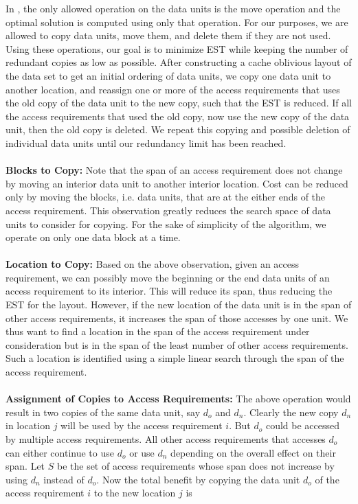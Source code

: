In \cite{cacheobliviouslayout}, the only allowed operation on the data units is
the move operation and the optimal solution is computed using only that
operation. For our purposes, we are allowed to copy data units, move them, and
delete them if they are not used. Using these operations, our goal is to minimize EST
while keeping the number of redundant copies as low as possible. After constructing a cache oblivious layout 
of the data set to get an initial ordering of data units, we copy one data unit to another location, and reassign 
one or more of the access requirements that uses the old copy of the data unit to the new copy, such that the EST is reduced. 
If all the access requirements that used the old copy, now use the new copy of the data unit, then the old copy is deleted. 
We repeat this copying and possible deletion of individual data units until our redundancy limit has been reached. \\
\\
{\bf Blocks to Copy:} Note that the span of an access requirement does not
change by moving an interior data unit to another interior location. Cost can
be reduced only by moving the blocks, i.e. data units, that are at the either ends of the access
requirement. This observation greatly reduces the search space of data units to
consider for copying. For the sake of simplicity of the algorithm, we operate
on only one data block at a time. \\
\\
{\bf Location to Copy:} Based on the above observation, given an access requirement, we can possibly move the beginning or the end data units of an access requirement to its interior. This will reduce its span, thus reducing the EST for the layout. However, if the new location of the data unit is in the span of other access requirements, it increases the span of those accesses by one unit. We thus want to find a location in the span of the access requirement under consideration but is in the span of the least number of other access requirements. Such a location is identified using a simple linear search through the span of the access requirement. \\
\\
{\bf Assignment of Copies to Access Requirements:} The above operation would result in two copies of the same data unit, say $d_o$ and $d_n$. Clearly the new copy $d_n$ in location $j$ will be used by the access requirement $i$.  But $d_o$ could be accessed by
multiple access requirements. All other access requirements that accesses $d_o$ can either continue to use $d_o$ or use $d_n$ depending on the overall effect on their span. Let $S$ be the set of access requirements whose span does not increase by using $d_n$ instead of $d_o$. Now the total benefit by copying the data unit $d_o$ of the access requirement $i$ to the new location $j$ is
